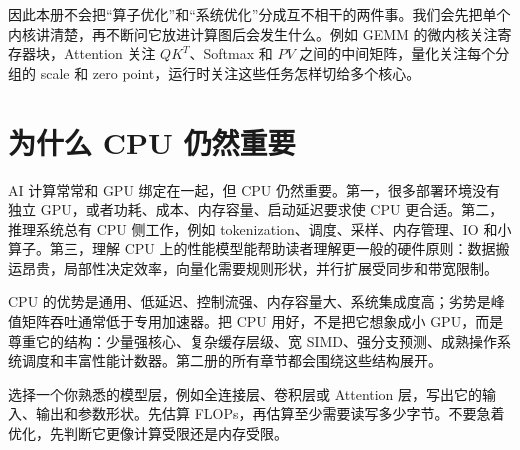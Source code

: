 因此本册不会把“算子优化”和“系统优化”分成互不相干的两件事。我们会先把单个内核讲清楚，再不断问它放进计算图后会发生什么。例如 GEMM 的微内核关注寄存器块，Attention 关注 $QK^T$、Softmax 和 $PV$ 之间的中间矩阵，量化关注每个分组的 scale 和 zero point，运行时关注这些任务怎样切给多个核心。

\section{为什么 CPU 仍然重要}

AI 计算常常和 GPU 绑定在一起，但 CPU 仍然重要。第一，很多部署环境没有独立 GPU，或者功耗、成本、内存容量、启动延迟要求使 CPU 更合适。第二，推理系统总有 CPU 侧工作，例如 tokenization、调度、采样、内存管理、IO 和小算子。第三，理解 CPU 上的性能模型能帮助读者理解更一般的硬件原则：数据搬运昂贵，局部性决定效率，向量化需要规则形状，并行扩展受同步和带宽限制。

CPU 的优势是通用、低延迟、控制流强、内存容量大、系统集成度高；劣势是峰值矩阵吞吐通常低于专用加速器。把 CPU 用好，不是把它想象成小 GPU，而是尊重它的结构：少量强核心、复杂缓存层级、宽 SIMD、强分支预测、成熟操作系统调度和丰富性能计数器。第二册的所有章节都会围绕这些结构展开。

\begin{exercisebox}
选择一个你熟悉的模型层，例如全连接层、卷积层或 Attention 层，写出它的输入、输出和参数形状。先估算 FLOPs，再估算至少需要读写多少字节。不要急着优化，先判断它更像计算受限还是内存受限。
\end{exercisebox}
